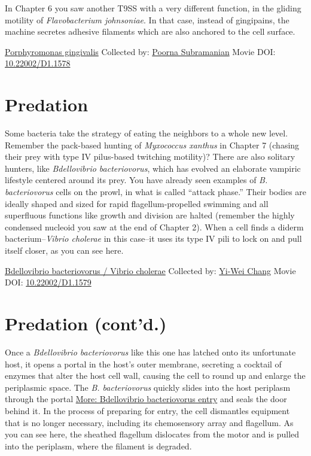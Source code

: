 \documentclass[]{tufte-book}
\begin{document}
In Chapter 6 you saw another T9SS with a very different function, in the gliding motility of \emph{Flavobacterium johnsoniae}. In that case, instead of gingipains, the machine secretes adhesive filaments which are also anchored to the cell surface.



\hypertarget{htmlwidget-0c47a4b86ed058fa2db7}{}

\label{fig:9-8}\protect\hyperlink{tree}{Porphyromonas gingivalis} Collected by: \protect\hyperlink{poorna_subramanian}{Poorna Subramanian} Movie DOI: \href{https://doi.org/10.22002/D1.1578}{10.22002/D1.1578}

\hypertarget{predation}{%
\section{Predation}\label{predation}}

Some bacteria take the strategy of eating the neighbors to a whole new level. Remember the pack-based hunting of \emph{Myxococcus xanthus} in Chapter 7 (chasing their prey with type IV pilus-based twitching motility)? There are also solitary hunters, like \emph{Bdellovibrio bacteriovorus}, which has evolved an elaborate vampiric lifestyle centered around its prey. You have already seen examples of \emph{B. bacteriovorus} cells on the prowl, in what is called ``attack phase.'' Their bodies are ideally shaped and sized for rapid flagellum-propelled swimming and all superfluous functions like growth and division are halted (remember the highly condensed nucleoid you saw at the end of Chapter 2). When a cell finds a diderm bacterium--\emph{Vibrio cholerae} in this case--it uses its type IV pili to lock on and pull itself closer, as you can see here.



\hypertarget{htmlwidget-3498ea709a4f6cbe3433}{}

\label{fig:9-9}\protect\hyperlink{tree}{Bdellovibrio bacteriovorus / Vibrio cholerae} Collected by: \protect\hyperlink{yi-wei_chang}{Yi-Wei Chang} Movie DOI: \href{https://doi.org/10.22002/D1.1579}{10.22002/D1.1579}

\hypertarget{predation-contd.}{%
\section{Predation (cont'd.)}\label{predation-contd.}}

Once a \emph{Bdellovibrio bacteriovorus} like this one has latched onto its unfortunate host, it opens a portal in the host's outer membrane, secreting a cocktail of enzymes that alter the host cell wall, causing the cell to round up and enlarge the periplasmic space. The \emph{B. bacteriovorus} quickly slides into the host periplasm through the portal \protect\hyperlink{Bdellovibrio_bacteriovorus_entry}{More: Bdellovibrio bacteriovorus entry} and seals the door behind it. In the process of preparing for entry, the cell dismantles equipment that is no longer necessary, including its chemosensory array and flagellum. As you can see here, the sheathed flagellum dislocates from the motor and is pulled into the periplasm, where the filament is degraded.
\end{document}
